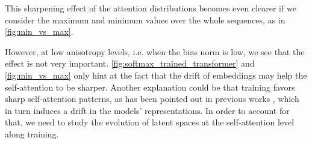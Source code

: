 This sharpening effect of the attention distributions becomes even clearer if we consider the maximum and minimum values over the whole sequences, as in \autoref{fig:min_vs_max}.

However, at low anisotropy levels, i.e. when the bias norm is low, we see that the effect is not very important. \autoref{fig:softmax_trained_transformer} and \autoref{fig:min_vs_max} only hint at the fact that the drift of embeddings may help the self-attention to be sharper. Another explanation could be that training favors sharp self-attention patterns, as has been pointed out in previous works \citep{clark-etal-2019-bert}, which in turn induces a drift in the models' representations. In order to account for that, we need to study the evolution of latent spaces at the self-attention level along training.

